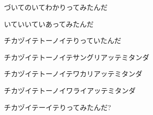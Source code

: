 \documentclass[a4paper,tate,twocolumn,12pt]{ltjtarticle}
\begin{document}
\begin{flushleft}
\begin{minipage}{\linewidth}
づいてのいてわかりってみたんだ

いていいていあってみたんだ

チカヅイテトーノイテりっていたんだ

チカヅイテトーノイテサングリアッテミタンダ

チカヅイテトーノイテワカリアッテミタンダ

チカヅイテトーノイワライアッテミタンダ

チカヅイテーイテりってみたんだ?
\end{minipage}

\end{flushleft}
\end{document}
